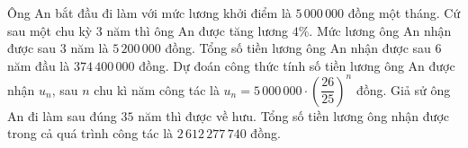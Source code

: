 \begin{ex}
Ông An bắt đầu đi làm với mức lương khởi điểm là $5\,000\,000$ đồng một tháng. Cứ sau một chu kỳ $3$ năm thì ông An được tăng lương $4\%$.
\choiceTF
{\True Mức lương ông An nhận được sau $3$ năm là $5\,200\,000$ đồng.}
{Tổng số tiền lương ông An nhận được sau $6$ năm đầu là $374\,400\,000$ đồng.}
{\True Dự đoán công thức tính số tiền lương ông An được nhận $u_n$, sau $n$ chu kì năm công tác là $u_n=5\,000\,000\cdot\left(\dfrac{26}{25}\right)^n$ đồng.}
{\True Giả sử ông An đi làm sau đúng $35$ năm thì được về hưu. Tổng số tiền lương ông nhận được trong cả quá trình công tác là $2\,612\,277\,740$ đồng.}
\end{ex}
